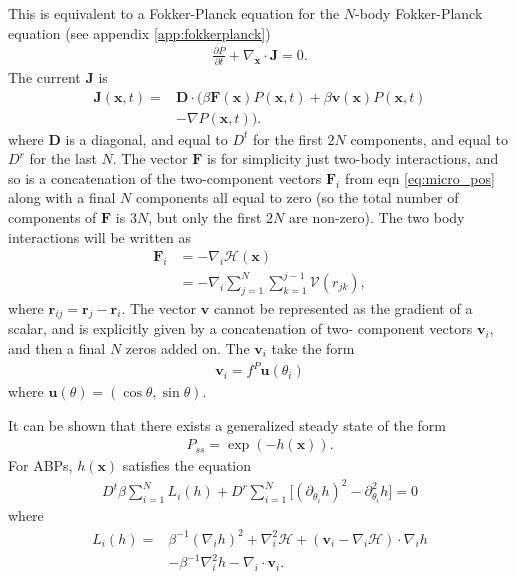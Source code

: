 \documentclass[twocolumn,amsmath,amssymb,aps]{revtex4-1}%
\begin{document}
This is equivalent to a Fokker-Planck equation for the $N$-body Fokker-Planck
equation (see appendix \ref{app:fokkerplanck})
\begin{align}\label{eq:NparticleFP}
  \frac{\partial P}{\partial t} +
  \nabla_{\bm{x}}\cdot\bm{J}=0.
\end{align}
The current $\bm{J}$ is
\begin{align}\label{eq:Nparticlecurrent}
  \bm{J}(\bm{x},t)=
  &\bm{D}\cdot(\beta\bm{F}(\bm{x})P(\bm{x},t)
  +\beta\bm{v}(\bm{x})P(\bm{x},t)\nonumber\\
  &-\nabla P(\bm{x},t)).
\end{align}
where $\bm{D}$ is a diagonal, and equal to $D^t$ for the first $2N$ components,
and equal to $D^r$ for the last $N$.
The vector $\bm{F}$ is for simplicity just two-body interactions, and so is a
concatenation of the two-component vectors $\bm{F}_i$ from eqn
\ref{eq:micro_pos} along with a final $N$ components all equal to zero (so the
total number of components of $\bm{F}$ is $3N$, but only the first $2N$ are
non-zero). The two body interactions will be written as
\begin{align}\label{eq:general_conservative_force}
  \bm{F}_i&=-\nabla_{i}\mathcal{H}(\bm{x})\nonumber\\
          &=-\nabla_{i}\sum_{j=1}^N\sum_{k=1}^{j-1}\mathcal{V}(r_{jk}),
\end{align}
where $\bm{r}_{ij}=\bm{r}_j-\bm{r}_i$.
The vector $\bm{v}$ cannot be represented
as the gradient of a scalar, and is explicitly given by a concatenation of two-
component vectors $\bm{v}_i$, and then a final $N$ zeros added on. The
$\bm{v}_i$ take the form
\begin{align}\label{eq:dissipative_force}
  \bm{v}_i =f^P\bm{u}(\theta_i)
\end{align}
where $\bm{u}(\theta)=(\cos\theta,\sin\theta)$.

It can be shown \cite{liverpool2018nonequilibrium} that there exists a
generalized steady state of the form
\begin{align}
  P_{ss}=\exp(-h(\bm{x})).
\end{align}
For ABPs, $h(\bm{x})$ satisfies the equation
\begin{align}\label{eq:steadystatecondition}
  D^t\beta\sum_{i=1}^{N}L_i(h)
  +D^r\sum_{i=1}^{N}\big[(\partial_{\theta_i}h)^2
  -\partial_{\theta_i}^2h\big]=0
\end{align}
where
\begin{align}\label{eq:L_i}
  L_i(h) =& \beta^{-1}(\nabla_ih)^2+\nabla_i^2\mathcal{H}
  +(\bm{v}_i-\nabla_i\mathcal{H})\cdot\nabla_ih\nonumber\\
  &-\beta^{-1}\nabla_i^2h-\nabla_i\cdot\bm{v}_i.
\end{align}
\end{document}
